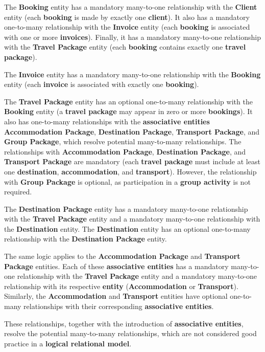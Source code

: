 \documentclass{article}
\begin{document}
The \textbf{Booking} entity has a mandatory many-to-one relationship with the \textbf{Client} entity (each \textbf{booking} is made by exactly one \textbf{client}). It also has a mandatory one-to-many relationship with the \textbf{Invoice} entity (each \textbf{booking} is associated with one or more \textbf{invoices}). Finally, it has a mandatory many-to-one relationship with the \textbf{Travel Package} entity (each \textbf{booking} contains exactly one \textbf{travel package}).

The \textbf{Invoice} entity has a mandatory many-to-one relationship with the \textbf{Booking} entity (each \textbf{invoice} is associated with exactly one \textbf{booking}).

The \textbf{Travel Package} entity has an optional one-to-many relationship with the \textbf{Booking} entity (a \textbf{travel package} may appear in zero or more \textbf{bookings}). It also has one-to-many relationships with the \textbf{associative entities} \textbf{Accommodation Package}, \textbf{Destination Package}, \textbf{Transport Package}, and \textbf{Group Package}, which resolve potential many-to-many relationships. The relationships with \textbf{Accommodation Package}, \textbf{Destination Package}, and \textbf{Transport Package} are mandatory (each \textbf{travel package} must include at least one \textbf{destination}, \textbf{accommodation}, and \textbf{transport}). However, the relationship with \textbf{Group Package} is optional, as participation in a \textbf{group activity} is not required.

The \textbf{Destination Package} entity has a mandatory many-to-one relationship with the \textbf{Travel Package} entity and a mandatory many-to-one relationship with the \textbf{Destination} entity. The \textbf{Destination} entity has an optional one-to-many relationship with the \textbf{Destination Package} entity.

The same logic applies to the \textbf{Accommodation Package} and \textbf{Transport Package} entities. Each of these \textbf{associative entities} has a mandatory many-to-one relationship with the \textbf{Travel Package} entity and a mandatory many-to-one relationship with its respective \textbf{entity} (\textbf{Accommodation} or \textbf{Transport}). Similarly, the \textbf{Accommodation} and \textbf{Transport} entities have optional one-to-many relationships with their corresponding \textbf{associative entities}.

These relationships, together with the introduction of \textbf{associative entities}, resolve the potential many-to-many relationships, which are not considered good practice in a \textbf{logical relational model}.
\end{document}
